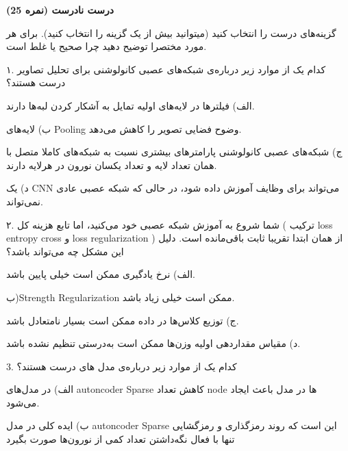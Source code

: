 \textbf{درست نادرست (نمره 25)}

گزینه‌های درست را انتخاب کنید (میتوانید بیش از یک گزینه را انتخاب کنید).
برای هر مورد مختصرا توضیح دهید چرا صحیح یا غلط است.

\vspace{0.75cm}
۱. کدام یک از موارد زیر درباره‌ی شبکه‌های عصبی کانولوشنی برای تحلیل تصاویر درست هستند؟


\vspace{0.5cm}

الف) فیلتر‌ها در لایه‌های اولیه تمایل به آشکار‌ کردن لبه‌ها دارند.
\vspace{1cm}

ب) لایه‌های Pooling وضوح فضایی تصویر را کاهش می‌دهد.
\vspace{1cm}

ج) شبکه‌های عصبی کانولوشنی پارامتر‌های بیشتری نسبت به شبکه‌های کاملا متصل با همان تعداد لایه و تعداد یکسان نورون در هرلایه دارند.

\vspace{1cm}

د) یک CNN می‌تواند برای وظایف  آموزش داده شود، در حالی که شبکه عصبی عادی نمی‌تواند.

\pagebreak
۲. شما شروع به آموزش شبکه عصبی خود می‌کنید، اما تابع هزینه‌ کل ( ترکیب loss entropy cross و loss regularization ) از همان ابتدا تقریبا ثابت باقی‌مانده است. دلیل این مشکل چه می‌تواند باشد؟


\vspace{0.5cm}
الف) نرخ یادگیری ممکن است خیلی پایین باشد.

\vspace{1cm}
ب){Strength Regularization} ممکن است خیلی زیاد باشد.

\vspace{1cm}
ج) توزیع کلاس‌ها در داده ممکن است بسیار نامتعادل باشد.

\vspace{1cm}
د) مقیاس مقداردهی اولیه وزن‌ها ممکن است به‌درستی تنظیم نشده باشد.




\vspace{1cm}
3. کدام یک از موارد زیر درباره‌ی مدل های {} درست هستند؟

\vspace{0.5cm}

الف) در مدل‌های {autoncoder Sparse} کاهش تعداد node ها در    مدل باعث ایجاد   می‌شود.

\vspace{1cm}
ب) ایده کلی در مدل {autoncoder Sparse} این است که روند رمز‌گذاری و رمزگشایی تنها با فعال نگه‌داشتن تعداد کمی از نورون‌ها صورت بگیرد

